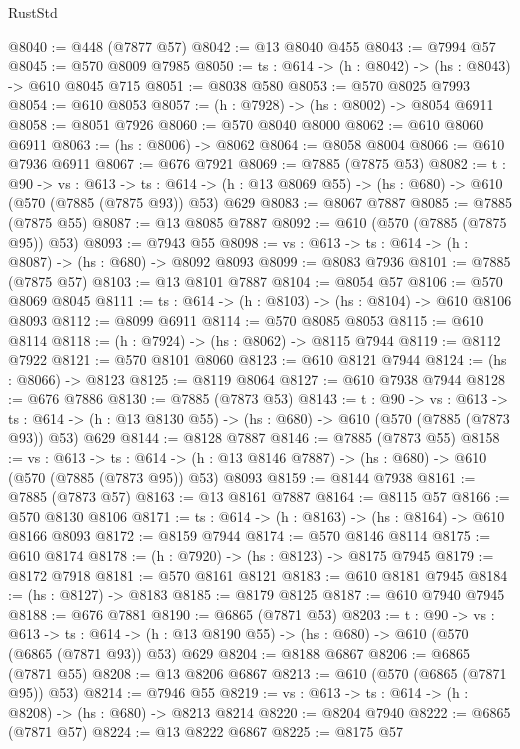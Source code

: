 \begin{lexlean}{RustStd}
\begin{coremodule}
@8040 := @448 (@7877 @57)
@8042 := @13 @8040 @455
@8043 := @7994 @57
@8045 := @570 @8009 @7985
@8050 := {ts : @614} -> (h : @8042) -> (hs : @8043) -> @610 @8045 @715
@8051 := @8038 @580
@8053 := @570 @8025 @7993
@8054 := @610 @8053
@8057 := (h : @7928) -> (hs : @8002) -> @8054 @6911
@8058 := @8051 @7926
@8060 := @570 @8040 @8000
@8062 := @610 @8060 @6911
@8063 := (hs : @8006) -> @8062
@8064 := @8058 @8004
@8066 := @610 @7936 @6911
@8067 := @676 @7921
@8069 := @7885 (@7875 @53)
@8082 := {t : @90} ->
  {vs : @613} ->
  {ts : @614} -> (h : @13 @8069 @55) -> (hs : @680) -> @610 (@570 (@7885 (@7875 @93)) @53) @629
@8083 := @8067 @7887
@8085 := @7885 (@7875 @55)
@8087 := @13 @8085 @7887
@8092 := @610 (@570 (@7885 (@7875 @95)) @53)
@8093 := @7943 @55
@8098 := {vs : @613} -> {ts : @614} -> (h : @8087) -> (hs : @680) -> @8092 @8093
@8099 := @8083 @7936
@8101 := @7885 (@7875 @57)
@8103 := @13 @8101 @7887
@8104 := @8054 @57
@8106 := @570 @8069 @8045
@8111 := {ts : @614} -> (h : @8103) -> (hs : @8104) -> @610 @8106 @8093
@8112 := @8099 @6911
@8114 := @570 @8085 @8053
@8115 := @610 @8114
@8118 := (h : @7924) -> (hs : @8062) -> @8115 @7944
@8119 := @8112 @7922
@8121 := @570 @8101 @8060
@8123 := @610 @8121 @7944
@8124 := (hs : @8066) -> @8123
@8125 := @8119 @8064
@8127 := @610 @7938 @7944
@8128 := @676 @7886
@8130 := @7885 (@7873 @53)
@8143 := {t : @90} ->
  {vs : @613} ->
  {ts : @614} -> (h : @13 @8130 @55) -> (hs : @680) -> @610 (@570 (@7885 (@7873 @93)) @53) @629
@8144 := @8128 @7887
@8146 := @7885 (@7873 @55)
@8158 := {vs : @613} ->
  {ts : @614} -> (h : @13 @8146 @7887) -> (hs : @680) -> @610 (@570 (@7885 (@7873 @95)) @53) @8093
@8159 := @8144 @7938
@8161 := @7885 (@7873 @57)
@8163 := @13 @8161 @7887
@8164 := @8115 @57
@8166 := @570 @8130 @8106
@8171 := {ts : @614} -> (h : @8163) -> (hs : @8164) -> @610 @8166 @8093
@8172 := @8159 @7944
@8174 := @570 @8146 @8114
@8175 := @610 @8174
@8178 := (h : @7920) -> (hs : @8123) -> @8175 @7945
@8179 := @8172 @7918
@8181 := @570 @8161 @8121
@8183 := @610 @8181 @7945
@8184 := (hs : @8127) -> @8183
@8185 := @8179 @8125
@8187 := @610 @7940 @7945
@8188 := @676 @7881
@8190 := @6865 (@7871 @53)
@8203 := {t : @90} ->
  {vs : @613} ->
  {ts : @614} -> (h : @13 @8190 @55) -> (hs : @680) -> @610 (@570 (@6865 (@7871 @93)) @53) @629
@8204 := @8188 @6867
@8206 := @6865 (@7871 @55)
@8208 := @13 @8206 @6867
@8213 := @610 (@570 (@6865 (@7871 @95)) @53)
@8214 := @7946 @55
@8219 := {vs : @613} -> {ts : @614} -> (h : @8208) -> (hs : @680) -> @8213 @8214
@8220 := @8204 @7940
@8222 := @6865 (@7871 @57)
@8224 := @13 @8222 @6867
@8225 := @8175 @57

\end{coremodule}
\end{lexlean}
